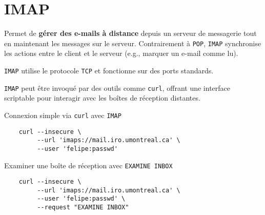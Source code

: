 \documentclass[a4paper]{report}
\begin{document}
    \section{IMAP}
    \begin{Protocole}[IMAP]
        Permet de \textbf{gérer des e-mails à distance} depuis un serveur de 
        messagerie tout en maintenant les messages sur le serveur. Contrairement 
        à \texttt{POP}, \texttt{IMAP} synchronise les actions entre le client et 
        le serveur (e.g., marquer un e-mail comme lu).
    \end{Protocole}

    \texttt{IMAP} utilise le protocole \texttt{TCP} et fonctionne sur des ports 
    standards.

    \begin{center}
    \end{center}

    \texttt{IMAP} peut être invoqué par des outils comme \texttt{curl}, offrant une 
    interface scriptable pour interagir avec les boîtes de réception distantes.

    \begin{EExample}{Connexion simple via \texttt{curl} avec \texttt{IMAP}}{}
        \begin{lstlisting}
    curl --insecure \
         --url 'imaps://mail.iro.umontreal.ca' \
         --user 'felipe:passwd'
        \end{lstlisting}
        \begin{center}
            \hyperlink{Connexion simple via curl avec IMAP}{
            }
        \end{center}
    \end{EExample}

    \begin{EExample}{Examiner une boîte de réception avec \texttt{EXAMINE INBOX}}{}
        \begin{lstlisting}
    curl --insecure \
         --url 'imaps://mail.iro.umontreal.ca' \
         --user 'felipe:passwd' \
         --request "EXAMINE INBOX"
        \end{lstlisting}
        \begin{center}
            \hyperlink{Examiner une boîte de réception avec EXAMINE INBOX}{
            }
        \end{center}
    \end{EExample}
\end{document}
